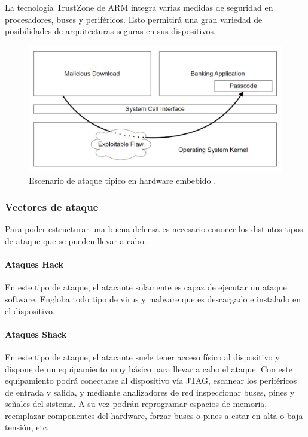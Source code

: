 La tecnología TrustZone de ARM integra varias medidas de seguridad en procesadores, buses y periféricos. Esto permitirá una gran variedad de posibilidades de arquitecturas seguras en sus dispositivos.


\begin{figure}
	\centering
	\includegraphics[width=1\textwidth]{imagenes/ataque.jpg}
	\caption{\label{fig1}Escenario de ataque típico en hardware embebido \cite{trustzone}.}
\end{figure}

\subsubsection{Vectores de ataque}
Para poder estructurar una buena defensa es necesario conocer los distintos tipos de ataque que se pueden llevar a cabo.

\paragraph{Ataques Hack}
En este tipo de ataque, el atacante solamente es capaz de ejecutar un ataque software. Engloba todo tipo de virus y malware que es descargado e instalado en el dispositivo.

\paragraph{Ataques Shack}
En este tipo de ataque, el atacante suele tener acceso físico al dispositivo y dispone de un equipamiento muy básico para llevar a cabo el ataque. Con este equipamiento podrá conectarse al dispositivo vía JTAG, escanear los periféricos de entrada y salida, y mediante analizadores de red inspeccionar buses, pines y señales del sistema. A su vez podrán reprogramar espacios de memoria, reemplazar componentes del hardware, forzar buses o pines a estar en alta o baja tensión, etc.

